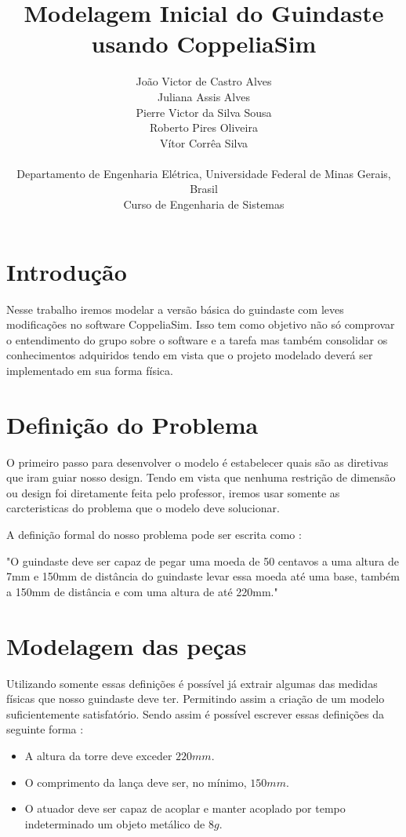 \documentclass[letterpaper, 10 pt]{ieeeconf}  %
\title{ Modelagem Inicial do Guindaste usando CoppeliaSim}
\author{João Victor de Castro Alves\\
        Juliana Assis Alves\\
        Pierre Victor da Silva Sousa\\
        Roberto Pires Oliveira\\
        Vítor Corrêa Silva\\
        \\
        Departamento de Engenharia Elétrica, Universidade Federal de Minas Gerais, Brasil\\
        Curso de Engenharia de Sistemas}
\begin{document}
\maketitle

\section{Introdução}

    Nesse trabalho iremos modelar a versão básica do guindaste com leves modificações 
    no software CoppeliaSim. Isso tem como objetivo  não só comprovar o entendimento do grupo 
    sobre o software e a tarefa mas também consolidar os conhecimentos adquiridos tendo em vista 
    que o projeto modelado deverá ser implementado em sua forma física.
    
\section{Definição do Problema}
    O primeiro passo para desenvolver o modelo é estabelecer quais são as diretivas que iram 
    guiar nosso design. Tendo em vista que nenhuma restrição de dimensão ou design foi diretamente feita pelo 
    professor, iremos usar somente as carcteristicas do problema que o modelo deve solucionar.

    A definição formal do nosso problema pode ser escrita como :

    \begin{center}
        "O guindaste deve ser capaz de pegar uma moeda de 50 centavos a uma altura de 7mm e 150mm de 
        distância do guindaste levar essa moeda até uma base, também a 150mm de distância e com uma 
        altura de até 220mm."
    \end{center}

\section{Modelagem das peças}   
    Utilizando somente essas definições é possível já extrair algumas das medidas físicas que nosso 
    guindaste deve ter. Permitindo assim a criação de um modelo suficientemente satisfatório. Sendo 
    assim é possível escrever essas definições da seguinte forma :

    \begin{itemize}
        \item A altura da torre deve exceder \(220mm\).
        \item O comprimento da lança deve ser, no mínimo, \(150mm\).
        \item O atuador deve ser capaz de acoplar e manter acoplado por tempo indeterminado um objeto metálico de \(8g\).
    \end{itemize}
\end{document}
